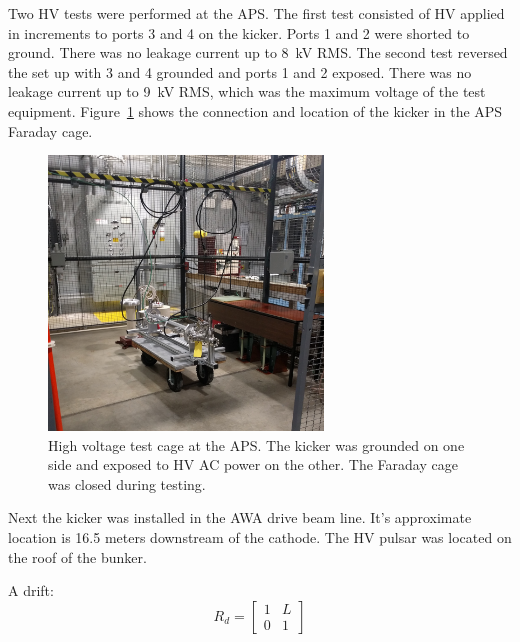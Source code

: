 
Two HV tests were performed at the APS. 
The first test consisted of HV applied in increments to ports 3 and 4 on the kicker.  
Ports 1 and 2 were shorted to ground. There was no leakage current up to \SI{8}{kV} RMS.
The second test reversed the set up with 3 and 4 grounded and ports 1 and 2 exposed. 
There was no leakage current up to \SI{9}{kV} RMS, which was the maximum voltage of the test equipment.
Figure~\ref{fig:AWAHVkicker} shows the connection and location of the kicker in the APS Faraday cage.
\begin{figure}%
	\begin{center}
		\includegraphics[width=0.65\textwidth]{./images/kicker1}\caption{High voltage test cage at the APS. The kicker was grounded on one side and exposed to HV AC power on the other. The Faraday cage was closed during testing. }
		\label{fig:AWAHVkicker}
	\end{center}
\end{figure}




Next the kicker was installed in the AWA drive beam line.
It's approximate location is 16.5 meters downstream of the cathode.
The HV pulsar was located on the roof of the bunker.




A drift: 
\begin{equation}
R_d = 
\begin{bmatrix}
1 & L \\
0 & 1
\end{bmatrix}
\end{equation}

